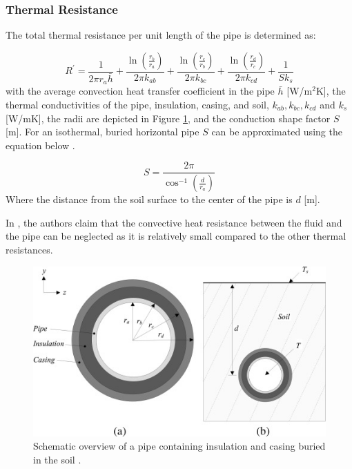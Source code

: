 \subsubsection{Thermal Resistance}
The total thermal resistance per unit length of the pipe is determined as: 

\begin{equation}
R^{\prime}=\frac{1}{2 \pi r_a \bar{h}}+\frac{\ln \left(\frac{r_b}{r_a}\right)}{2 \pi k_{a b}}+\frac{\ln \left(\frac{r_c}{r_b}\right)}{2 \pi k_{b c}}+\frac{\ln \left(\frac{r_d}{r_c}\right)}{2 \pi k_{c d}}+\frac{1}{S k_s}
\end{equation}
with the average convection heat transfer coefficient in the pipe $\bar{h}$ [W/m$^2$K], the thermal conductivities of the pipe, insulation, casing, and soil, $k_{ab}, k_{bc}, k_{cd}$ and $k_s$ [W/mK], the radii are depicted in Figure \ref{fig::pipe}, and the conduction shape factor $S$ [m]. For an isothermal, buried horizontal pipe $S$ can be approximated using the equation below \cite{PipePDE}. 

\begin{equation}\label{eq::shapefactor}
S=\frac{2 \pi}{\cos ^{-1}\left(\frac{d}{r_a}\right)}
\end{equation}
Where the distance from the soil surface to the center of the pipe is $d$ [m]. 

In \cite{booklowT}, the authors claim that the convective heat resistance between the fluid and the pipe can be neglected as it is relatively small compared to the other thermal resistances.  

\begin{figure}
    \centering
    \includegraphics[width=0.5\linewidth]{Literature Survey - DCSC template/figuresLIT/pijpdoorsnede.jpg}
    \caption{Schematic overview of a pipe containing insulation and casing buried in the soil \cite{PipePDE}.}
    \label{fig::pipe}
\end{figure}  

